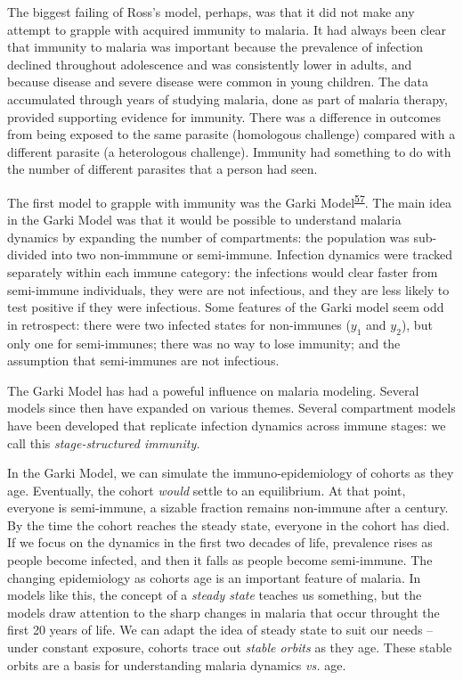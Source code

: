 \documentclass[
]{book}
\begin{document}
The biggest failing of Ross's model, perhaps, was that it did not make any attempt to grapple with acquired immunity to malaria. It had always been clear that immunity to malaria was important because the prevalence of infection declined throughout adolescence and was consistently lower in adults, and because disease and severe disease were common in young children. The data accumulated through years of studying malaria, done as part of malaria therapy, provided supporting evidence for immunity. There was a difference in outcomes from being exposed to the same parasite (homologous challenge) compared with a different parasite (a heterologous challenge). Immunity had something to do with the number of different parasites that a person had seen.

The first model to grapple with immunity was the Garki Model\textsuperscript{\protect\hyperlink{ref-DietzK1974GarkiModel}{57}}. The main idea in the Garki Model was that it would be possible to understand malaria dynamics by expanding the number of compartments: the population was sub-divided into two non-immmune or semi-immune. Infection dynamics were tracked separately within each immune category: the infections would clear faster from semi-immune individuals, they were are not infectious, and they are less likely to test positive if they were infectious. Some features of the Garki model seem odd in retrospect: there were two infected states for non-immunes (\(y_1\) and \(y_2\)), but only one for semi-immunes; there was no way to lose immunity; and the assumption that semi-immunes are not infectious.

The Garki Model has had a poweful influence on malaria modeling. Several models since then have expanded on various themes. Several compartment models have been developed that replicate infection dynamics across immune stages: we call this \emph{stage-structured immunity.}

In the Garki Model, we can simulate the immuno-epidemiology of cohorts as they age. Eventually, the cohort \emph{would} settle to an equilibrium. At that point, everyone is semi-immune, a sizable fraction remains non-immune after a century. By the time the cohort reaches the steady state, everyone in the cohort has died. If we focus on the dynamics in the first two decades of life, prevalence rises as people become infected, and then it falls as people become semi-immune. The changing epidemiology as cohorts age is an important feature of malaria. In models like this, the concept of a \emph{steady state} teaches us something, but the models draw attention to the sharp changes in malaria that occur throught the first 20 years of life. We can adapt the idea of steady state to suit our needs -- under constant exposure, cohorts trace out \emph{stable orbits} as they age. These stable orbits are a basis for understanding malaria dynamics \emph{vs.} age.
\end{document}
